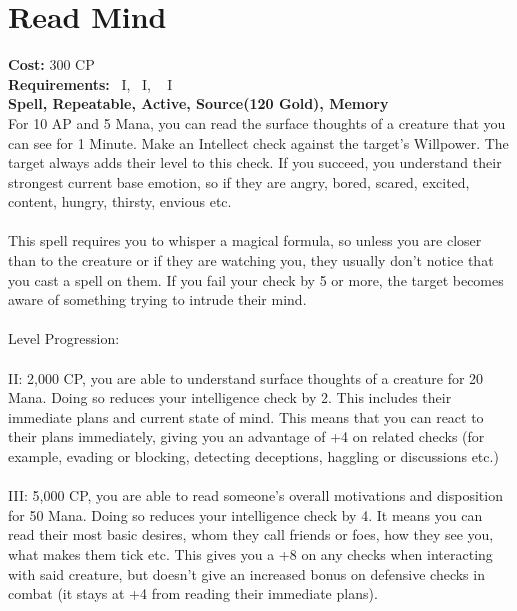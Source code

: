 \section{Read Mind}\label{spell:readMind}
\textbf{Cost:} 300 CP\\
\textbf{Requirements:}~ I,~ I, ~ I\\
\textbf{Spell, Repeatable, Active, Source(120 Gold), Memory}\\
For 10 AP and 5 Mana, you can read the surface thoughts of a creature that you can see for 1 Minute.
Make an Intellect check against the target's Willpower.
The target always adds their level to this check.
If you succeed, you understand their strongest current base emotion, so if they are angry, bored, scared, excited, content, hungry, thirsty, envious etc.\\
\\
This spell requires you to whisper a magical formula, so unless you are closer than  to the creature or if they are watching you, they usually don't notice that you cast a spell on them.
If you fail your check by 5 or more, the target becomes aware of something trying to intrude their mind.\\
\\
Level Progression:\\
\\
II: 2,000 CP, you are able to understand surface thoughts of a creature for 20 Mana.
Doing so reduces your intelligence check by 2.
This includes their immediate plans and current state of mind.
This means that you can react to their plans immediately, giving you an advantage of +4 on related checks (for example, evading or blocking, detecting deceptions, haggling or discussions etc.)\\
\\
III: 5,000 CP, you are able to read someone's overall motivations and disposition for 50 Mana.
Doing so reduces your intelligence check by 4.
It means you can read their most basic desires, whom they call friends or foes, how they see you, what makes them tick etc.
This gives you a +8 on any checks when interacting with said creature, but doesn't give an increased bonus on defensive checks in combat (it stays at +4 from reading their immediate plans).\\